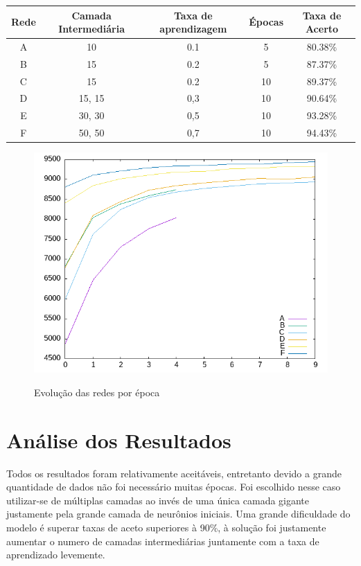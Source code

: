 \documentclass[
	article,			%
	11pt,				%
	oneside,			%
	a4paper,			%
	openany,
	english,			%
	brazil,				%
	sumario=tradicional
	]{abntex2}
\begin{document}
\begin{table}[h]
	\centering
	\begin{tabular}{||c|c|c|c|c||}
		\hline
			Rede & Camada Intermediária & Taxa de aprendizagem & Épocas & Taxa de Acerto \\
		\hline\hline
			A & 10 & 0.1 & 5 & 80.38\% \\
		\hline
			B & 15 & 0.2 & 5 & 87.37\% \\
		\hline
			C & 15 & 0.2 & 10 & 89.37\% \\
		\hline
			D & 15, 15 & 0,3 & 10 & 90.64\% \\
		\hline
			E & 30, 30 & 0,5 & 10 & 93.28\% \\
		\hline
			F & 50, 50 & 0,7 & 10 & 94.43\% \\
		\hline
	\end{tabular}
\end{table}

\begin{figure}[H]
	\centering
	\caption{Evolução das redes por época}
	\includegraphics[scale = 0.75]{Redes.png}
	\label{Redes}
	\centering
\end{figure}

\section{Análise dos Resultados}
Todos os resultados foram relativamente aceitáveis, entretanto devido
a grande quantidade de dados não foi necessário muitas épocas.
Foi escolhido nesse caso utilizar-se de múltiplas camadas ao
invés de uma única camada gigante justamente pela grande camada de
neurônios iniciais. Uma grande dificuldade do modelo é superar
taxas de aceto superiores à 90\%, à solução foi justamente aumentar
o numero de camadas intermediárias juntamente com a taxa de aprendizado
levemente.
\end{document}
